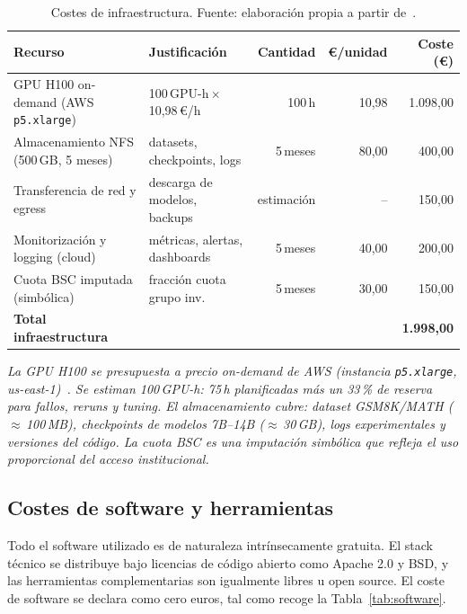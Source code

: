 \begin{table}[H]
\centering
\caption{Costes de infraestructura. Fuente: elaboración propia a partir de~\cite{lambda2026,aws2026}.}
\label{tab:infraestructura}
\footnotesize
\begin{tabular}{l l r r r}
\toprule
\textbf{Recurso} & \textbf{Justificación} & \textbf{Cantidad} & \textbf{\euro{}/unidad} & \textbf{Coste (\euro{})} \\
\midrule
GPU H100 on-demand (AWS \texttt{p5.xlarge})  & 100\,GPU-h\,$\times$\,10,98\,\euro{}/h~\cite{aws2026} & 100\,h & 10,98 & 1.098,00 \\
Almacenamiento NFS (500\,GB, 5 meses)        & datasets, checkpoints, logs    & 5\,meses & 80,00 & 400,00 \\
Transferencia de red y egress                & descarga de modelos, backups   & estimación & -- & 150,00 \\
Monitorización y logging (cloud)             & métricas, alertas, dashboards  & 5\,meses & 40,00 & 200,00 \\
Cuota BSC imputada (simbólica)               & fracción cuota grupo inv.      & 5\,meses & 30,00 & 150,00 \\
\midrule
\textbf{Total infraestructura} & & & & \textbf{1.998,00} \\
\bottomrule
\end{tabular}
\end{table}

\noindent\textit{\scriptsize La GPU H100 se presupuesta a precio on-demand de AWS (instancia \texttt{p5.xlarge}, us-east-1)~\cite{aws2026}. Se estiman 100\,GPU-h: 75\,h planificadas más un 33\,\% de reserva para fallos, reruns y tuning. El almacenamiento cubre: dataset GSM8K/MATH ($\approx$\,100\,MB), checkpoints de modelos 7B--14B ($\approx$\,30\,GB), logs experimentales y versiones del código. La cuota BSC es una imputación simbólica que refleja el uso proporcional del acceso institucional.}

\subsection{Costes de software y herramientas}

Todo el software utilizado es de naturaleza intrínsecamente gratuita. El stack técnico se distribuye bajo licencias de código abierto como Apache 2.0 y BSD, y las herramientas complementarias son igualmente libres u open source. El coste de software se declara como cero euros, tal como recoge la Tabla~\ref{tab:software}.

